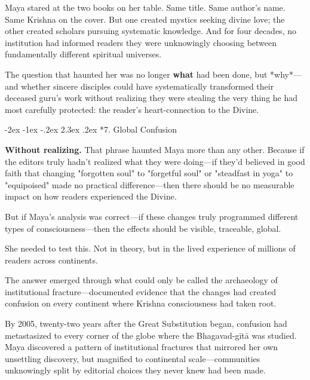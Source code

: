 \documentclass[12pt,twoside]{book}
\makeatletter
\def\cleardoublepage{\clearpage\if@twoside \ifodd\c@page\else\hbox{}\thispagestyle{empty}\newpage\if@twocolumn\hbox{}\newpage\fi\fi\fi}
\renewcommand\section{\@startsection{section}{1}{\z@}%
{-2ex \@plus -1ex \@minus -.2ex}%
{2.3ex \@plus.2ex}%
{\normalfont\Large\bfseries}}
\makeatother
\begin{document}
Maya stared at the two books on her table. Same title. Same author's name. Same Krishna on the cover. But one created mystics seeking divine love; the other created scholars pursuing systematic knowledge. And for four decades, no institution had informed readers they were unknowingly choosing between fundamentally different spiritual universes.

The question that haunted her was no longer \textbf{what} had been done, but *why*—and whether sincere disciples could have systematically transformed their deceased guru's work without realizing they were stealing the very thing he had most carefully protected: the reader's heart-connection to the Divine.

\cleardoublepage
\vspace*{0.20\textheight}
\section*{7. Global Confusion}
\thispagestyle{chapterpage}

\vspace{0.3cm}

\normalfont\justifying
\textbf{Without realizing.} That phrase haunted Maya more than any other. Because if the editors truly hadn't realized what they were doing—if they'd believed in good faith that changing "forgotten soul" to "forgetful soul" or "steadfast in yoga" to "equipoised" made no practical difference—then there should be no measurable impact on how readers experienced the Divine.

But if Maya's analysis was correct—if these changes truly programmed different types of consciousness—then the effects should be visible, traceable, global.

She needed to test this. Not in theory, but in the lived experience of millions of readers across continents.

The answer emerged through what could only be called the archaeology of institutional fracture—documented evidence that the changes had created confusion on every continent where Krishna consciousness had taken root.

By 2005, twenty-two years after the Great Substitution began, confusion had metastasized to every corner of the globe where the Bhagavad-gītā was studied. Maya discovered a pattern of institutional fractures that mirrored her own unsettling discovery, but magnified to continental scale—communities unknowingly split by editorial choices they never knew had been made.
\end{document}
